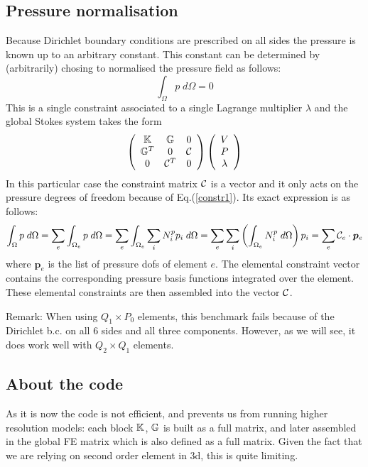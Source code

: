 \subsection*{Pressure normalisation} 

Because Dirichlet boundary conditions are prescribed on all sides the 
pressure is known up to an arbitrary constant. This constant can be 
determined by (arbitrarily) chosing 
to normalised the pressure field as follows:
\begin{equation}
\int_\Omega p \; d\Omega = 0 \label{constr1}
\end{equation}
This is a single constraint associated to a single Lagrange multiplier $\lambda$ and 
the global Stokes system takes the form 
\[
\left(
\begin{array}{ccc}
{\mathbb{K}} & {\mathbb{G}} & 0 \\
{\mathbb{G}}^T & 0 & {\cal C}\\
0 & {\cal C}^T & 0
\end{array}
\right)
\left(
\begin{array}{c}
V \\ P \\ \lambda
\end{array}
\right)
\]
In this particular case the constraint matrix ${\cal C}$ is a vector and it only acts on the pressure degrees of freedom because
of Eq.(\ref{constr1}). Its exact expression is as follows:
\[
\int_\Omega p \; d\Omega = \sum_e \int_{\Omega_e}  p \; d\Omega 
=\sum_e \int_{\Omega_e}  \sum_{i} N^p_i p_i \; d\Omega  
=\sum_e \sum_i \left( \int_{\Omega_e}  N^p_i \; d\Omega \right)  p_i 
=\sum_e {\cal C}_e \cdot {\bm p}_e
\] 
where ${\bm p}_e$ is the list of pressure dofs of element $e$. The elemental constraint vector contains the 
corresponding pressure basis functions integrated over the element. These elemental constraints are then 
assembled into the vector ${\cal C}$.

Remark: When using $Q_1 \times P_0$ elements, this benchmark fails 
because of the Dirichlet b.c. on all 6 sides and all three components.
However, as we will see, it does work well with $Q_2 \times Q_1$ elements. 

\subsection*{About the code}

As it is now the code is not efficient, and prevents us from running 
higher resolution models: each block ${\mathbb{K}}$, ${\mathbb{G}}$ is built as a full matrix, 
and later assembled in the global FE matrix which is also defined as a 
full matrix.
Given the fact that we are relying on second order element in 3d, 
this is quite limiting.


